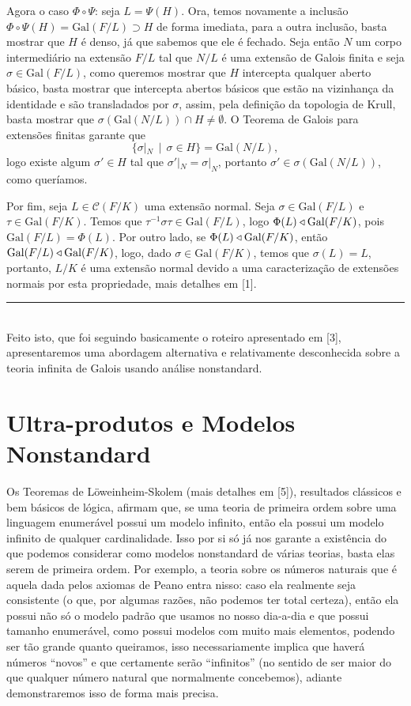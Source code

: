 \documentclass[12pt,a4paper]{article}
\def\eop{\hfill\rule{2.5mm}{2.5mm} \\ }
\theoremstyle{definition}
\begin{document}
Agora o caso $\Phi \circ \Psi$: seja $L=\Psi(H)$. Ora, temos novamente a inclusão $\Phi \circ \Psi(H)=\text{Gal}(F/L)\supset H$ de forma imediata, para a outra inclusão, basta mostrar que $H$ é denso, já que sabemos que ele é fechado. Seja então $N$ um corpo intermediário na extensão $F/L$ tal que $N/L$ é uma extensão de Galois finita e seja $\sigma \in \text{Gal}(F/L)$, como queremos mostrar que $H$ intercepta qualquer aberto básico, basta mostrar que intercepta abertos básicos que estão na vizinhança da identidade e são transladados por $\sigma$, assim, pela definição da topologia de Krull, basta mostrar que $\sigma\left(\text{Gal}(N/L)\right)\cap H\neq \emptyset$. O Teorema de Galois para extensões finitas garante que $$\{\sigma|_N \ \ |\ \  \sigma \in H\}=\text{Gal}(N/L),$$ logo existe algum $\sigma' \in H$ tal que $\sigma'|_N=\sigma|_N$, portanto $\sigma'\in \sigma(\text{Gal}(N/L))$, como queríamos. 

Por fim, seja $L\in \mathcal{C}(F/K)$ uma extensão normal. Seja $\sigma \in \text{Gal}(F/L)$ e $\tau \in \text{Gal}(F/K)$. Temos que $\tau^{-1}\sigma \tau \in \text{Gal}(F/L)$, logo $\Phi(L)\triangleleft \text{\upshape Gal\itshape}(F/K)$, pois $\text{Gal}(F/L)=\Phi(L)$. Por outro lado, se $\Phi(L)\triangleleft \text{\upshape Gal\itshape}(F/K)$, então $\text{Gal}(F/L)\triangleleft \text{\upshape Gal\itshape}(F/K)$, logo, dado $\sigma \in \text{Gal}(F/K)$, temos que $\sigma(L)=L$, portanto, $L/K$ é uma extensão normal devido a uma caracterização de extensões normais por esta propriedade, mais detalhes em [1]. \eop

Feito isto, que foi seguindo basicamente o roteiro apresentado em [3], apresentaremos uma abordagem alternativa e relativamente desconhecida sobre a teoria infinita de Galois usando análise nonstandard.

\section{Ultra-produtos e Modelos Nonstandard}

Os Teoremas de Löweinheim-Skolem (mais detalhes em [5]), resultados clássicos e bem básicos de lógica, afirmam que, se uma teoria de primeira ordem sobre uma linguagem enumerável possui um modelo infinito, então ela possui um modelo infinito de qualquer cardinalidade. Isso por si só já nos garante a existência do que podemos considerar como modelos nonstandard de várias teorias, basta elas serem de primeira ordem. Por exemplo, a teoria sobre os números naturais que é aquela dada pelos axiomas de Peano entra nisso: caso ela realmente seja consistente (o que, por algumas razões, não podemos ter total certeza), então ela possui não só o modelo padrão que usamos no nosso dia-a-dia e que possui tamanho enumerável, como possui modelos com muito mais elementos, podendo ser tão grande quanto queiramos, isso necessariamente implica que haverá números ``novos'' e que certamente serão ``infinitos'' (no sentido de ser maior do que qualquer número natural que normalmente concebemos), adiante demonstraremos isso de forma mais precisa. 
\end{document}
